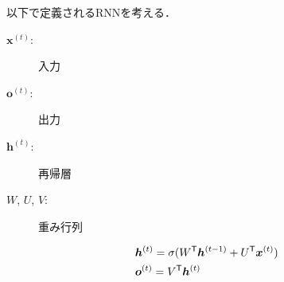 \documentclass[dvipdfmx,autodetect-engine,12pt,fleqn]{jsarticle}
\begin{document}
以下で定義されるRNNを考える．
\newcommand{\inputvector}[1]{\bm{x}^{(#1)}}
\newcommand{\outputvector}[1]{\bm{o}^{(#1)}}
\newcommand{\hiddenvector}[1]{\bm{h}^{(#1)}}
\newcommand{\activatevector}[1]{\bm{a}^{(#1)}}
\begin{description}
\item[$\inputvector{t}$:] 入力
\item[$\outputvector{t}$:] 出力
\item[$\hiddenvector{t}$:] 再帰層
\item[$W$, $U$, $V$:] 重み行列
\end{description}
\begin{equation}
\begin{split}
\label{eq:rnn prop}
&\hiddenvector{t}=\activation{W^\transpose\hiddenvector{t-1}+U^\transpose\inputvector{t}}\\
&\outputvector{t}=V^\transpose\hiddenvector{t}
\end{split}
\end{equation}

\end{document}
